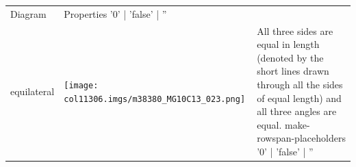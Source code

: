\begin{table}[H]
\begin{center}
\begin{xtabular*}{\mytablewidth}[t]{|p{10\mystarwidth}|p{10\mystarwidth}|p{
10\mystarwidth}|}
    
        Diagram &
    
    
        Properties%
'0' | 'false' | ''
     \tabularnewline{}
    
    
        equilateral &
    
    
        
                  
    \setcounter{subfigure}{0}

\label{m38380*id317558}
    \begin{center}
   
\label{m38380*id317558!!!underscore!!!media}\label{
m38380*id317558!!!underscore!!!printimage}\texttt{[image: col11306.imgs/m38380\_MG10C13\_023.png]} %
        
      \vspace{2pt}
    \vspace{.1in}
    
    \end{center}



    \addtocounter{footnote}{-0}
    
                 &
    
    
        All three sides are equal in length (denoted by the short lines drawn
through all the sides of equal length) and all three angles are equal.%
make-rowspan-placeholders
'0' | 'false' | ''
     \tabularnewline{}
    

\end{xtabular*}
\end{center}
\end{table}
